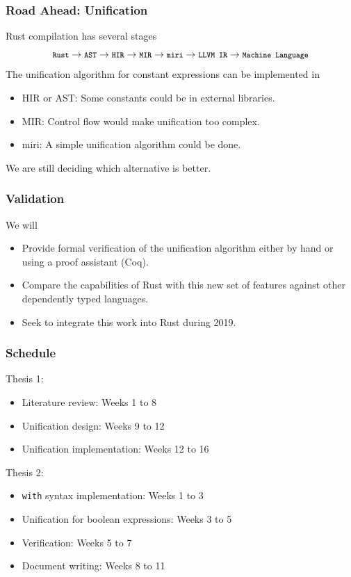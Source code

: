 \documentclass{beamer}
\newcommand{\code}[1] {\texttt{\footnotesize #1}}
\begin{document}
\begin{frame}[fragile]
    \frametitle{Road Ahead: Unification}
    Rust compilation has several stages
    $$\code{Rust} \rightarrow \code{AST} \rightarrow \code{HIR} \rightarrow \code{MIR} \rightarrow \code{miri} \rightarrow \code{LLVM IR} \rightarrow \code{Machine Language}$$
    The unification algorithm for constant expressions can be implemented in
    \begin{itemize}
        \item HIR or AST: Some constants could be in external libraries.
        \item MIR: Control flow would make unification too complex. 
        \item miri: A simple unification algorithm could be done.
    \end{itemize}
    We are still deciding which alternative is better.
\end{frame}

\begin{frame}[fragile]
    \frametitle{Validation}
    We will
    \begin{itemize}
        \item Provide formal verification of the unification algorithm either by hand or using a proof assistant (Coq).
        \item Compare the capabilities of Rust with this new set of features against other dependently typed languages.
        \item Seek to integrate this work into Rust during 2019.
    \end{itemize}
\end{frame}

\begin{frame}[fragile]
    \frametitle{Schedule}
    Thesis 1:
    \begin{itemize}
        \item Literature review: Weeks 1 to 8
        \item Unification design: Weeks 9 to 12
        \item Unification implementation: Weeks 12 to 16
    \end{itemize}
    Thesis 2:
    \begin{itemize}
        \item \code{with} syntax implementation: Weeks 1 to 3
        \item Unification for boolean expressions: Weeks 3 to 5
        \item Verification: Weeks 5 to 7
        \item Document writing: Weeks 8 to 11
    \end{itemize}
\end{frame}
\end{document}
